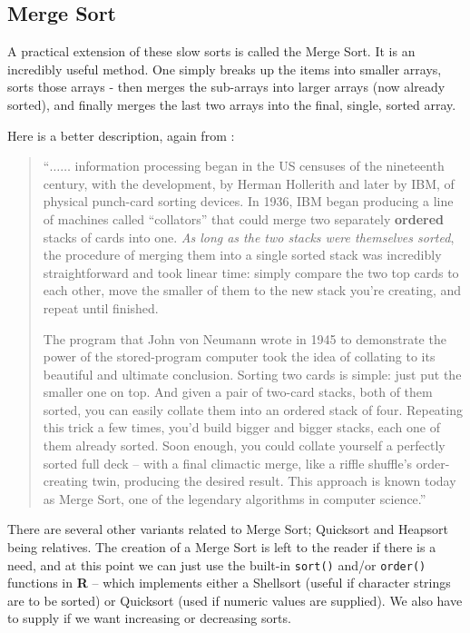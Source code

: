 \subsection{Merge Sort}
A practical extension of these slow sorts is called the Merge Sort.  It is an incredibly useful method.  One simply breaks up the items into smaller arrays, sorts those arrays - then merges the sub-arrays into larger arrays (now already sorted), and finally merges the last two arrays into the final, single, sorted array.

Here is a better description, again from \cite{Christian2016}:
\begin{quote}
``$\dots \dots$ information processing began in the US censuses of the nineteenth century, with the development, by Herman Hollerith and later by IBM, of physical punch-card sorting devices. In 1936, IBM began producing a line of machines called ``collators'' that could merge two separately \textbf{ordered} stacks of cards into one. \textit{As long as the two stacks were themselves sorted}, the procedure of merging them into a single sorted stack was incredibly straightforward and took linear time: simply compare the two top cards to each other, move the smaller of them to the new stack you're creating, and repeat until finished.

The program that John von Neumann wrote in 1945 to demonstrate the power of the stored-program computer took the idea of collating to its beautiful and ultimate conclusion. Sorting two cards is simple: just put the smaller one on top. And given a pair of two-card stacks, both of them sorted, you can easily collate them into an ordered stack of four. Repeating this trick a few times, you'd build bigger and bigger stacks, each one of them already sorted. Soon enough, you could collate yourself a perfectly sorted full deck -- with a final climactic merge, like a riffle shuffle's order-creating twin, producing the desired result. This approach is known today as Merge Sort, one of the legendary algorithms in computer science.''
\end{quote}

There are several other variants related to Merge Sort; Quicksort and Heapsort being relatives.  The creation of a Merge Sort is left to the reader if there is a need, and at this point we can just use the built-in \texttt{sort()}  and/or \texttt{order()} functions in \textbf{R} -- which implements either a Shellsort (useful if character strings are to be sorted) or Quicksort (used if numeric values are supplied).   We also have to supply if we want increasing or decreasing sorts.

